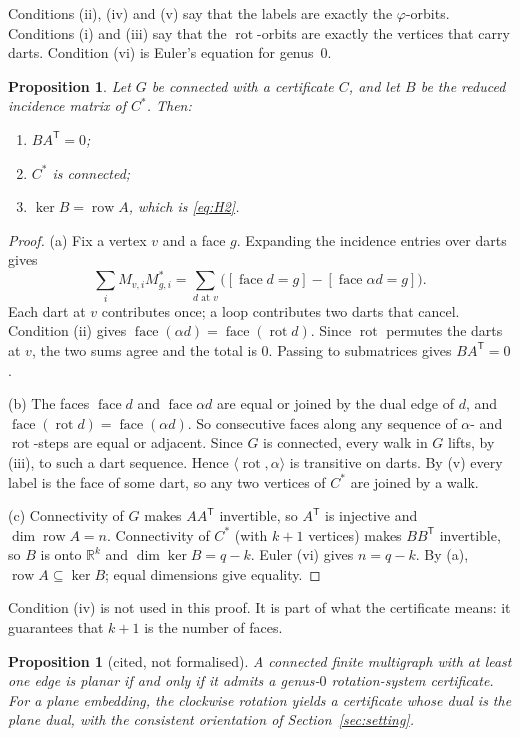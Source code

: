 \documentclass[11pt]{amsart}
\theoremstyle{plain}
\newtheorem{proposition}[theorem]{Proposition}
\theoremstyle{definition}
\theoremstyle{remark}
\newcommand{\R}{\mathbb{R}}
\newcommand{\T}{\mathsf{T}}
\newcommand{\row}{\operatorname{row}}
\newcommand{\face}{\operatorname{face}}
\newcommand{\rot}{\operatorname{rot}}
\begin{document}
Conditions (ii), (iv) and (v) say that the labels are exactly the $\varphi$-orbits. Conditions (i) and (iii) say
that the $\rot$-orbits are exactly the vertices that carry darts. Condition (vi) is Euler's equation for genus~$0$.

\begin{proposition}\label{prop:H2}
Let $G$ be connected with a certificate $C$, and let $B$ be the reduced incidence matrix of $C^\ast$. Then:
\begin{enumerate}\renewcommand{\labelenumi}{(\alph{enumi})}
\item $BA^{\T}=0$;
\item $C^\ast$ is connected;
\item $\ker B=\row A$, which is \eqref{eq:H2}.
\end{enumerate}
\end{proposition}
\begin{proof}
(a) Fix a vertex $v$ and a face $g$. Expanding the incidence entries over darts gives
\[
\sum_i M_{v,i}M^\ast_{g,i}=\sum_{d\text{ at }v}\bigl([\face d=g]-[\face\alpha d=g]\bigr).
\]
Each dart at $v$ contributes once; a loop contributes two darts that cancel. Condition (ii) gives
$\face(\alpha d)=\face(\rot d)$. Since $\rot$ permutes the darts at $v$, the two sums agree and the total is $0$.
Passing to submatrices gives $BA^{\T}=0$.

(b) The faces $\face d$ and $\face\alpha d$ are equal or joined by the dual edge of $d$, and
$\face(\rot d)=\face(\alpha d)$. So consecutive faces along any sequence of $\alpha$- and $\rot$-steps are equal or
adjacent. Since $G$ is connected, every walk in $G$ lifts, by (iii), to such a dart sequence. Hence
$\langle\rot,\alpha\rangle$ is transitive on darts. By (v) every label is the face of some dart, so any two
vertices of $C^\ast$ are joined by a walk.

(c) Connectivity of $G$ makes $AA^{\T}$ invertible, so $A^{\T}$ is injective and $\dim\row A=n$. Connectivity of
$C^\ast$ (with $k+1$ vertices) makes $BB^{\T}$ invertible, so $B$ is onto $\R^k$ and $\dim\ker B=q-k$. Euler (vi)
gives $n=q-k$. By (a), $\row A\subseteq\ker B$; equal dimensions give equality.
\end{proof}

Condition (iv) is not used in this proof. It is part of what the certificate means: it guarantees that $k+1$ is
the number of faces.

\begin{proposition}[cited, not formalised]\label{prop:cited}
A connected finite multigraph with at least one edge is planar if and only if it admits a genus-$0$ rotation-system
certificate. For a plane embedding, the clockwise rotation yields a certificate whose dual is the plane dual,
with the consistent orientation of Section~\ref{sec:setting}.
\end{proposition}
\end{document}
